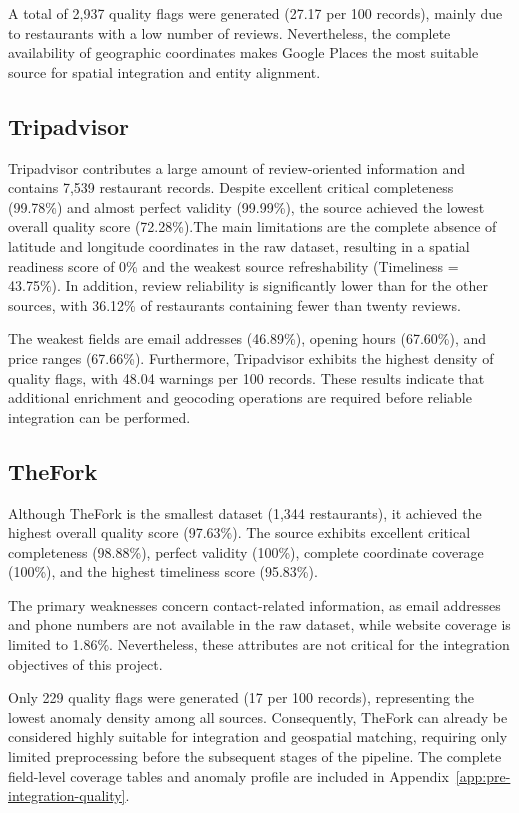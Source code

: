A total of 2,937 quality flags were generated (27.17 per 100 records), mainly due to restaurants with a low number of reviews. Nevertheless, the complete availability of geographic coordinates makes Google Places the most suitable source for spatial integration and entity alignment.

\subsection{Tripadvisor}

Tripadvisor contributes a large amount of review-oriented information and contains 7,539 restaurant records. Despite excellent critical completeness (99.78\%) and almost perfect validity (99.99\%), the source achieved the lowest overall quality score (72.28\%).The main limitations are the complete absence of latitude and longitude coordinates in the raw dataset, resulting in a spatial readiness score of 0\% and the weakest source refreshability (Timeliness = 43.75\%). In addition, review reliability is significantly lower than for the other sources, with 36.12\% of restaurants containing fewer than twenty reviews.

The weakest fields are email addresses (46.89\%), opening hours (67.60\%), and price ranges (67.66\%). Furthermore, Tripadvisor exhibits the highest density of quality flags, with 48.04 warnings per 100 records. These results indicate that additional enrichment and geocoding operations are required before reliable integration can be performed.

\subsection{TheFork}

Although TheFork is the smallest dataset (1,344 restaurants), it achieved the highest overall quality score (97.63\%). The source exhibits excellent critical completeness (98.88\%), perfect validity (100\%), complete coordinate coverage (100\%), and the highest timeliness score (95.83\%).

The primary weaknesses concern contact-related information, as email addresses and phone numbers are not available in the raw dataset, while website coverage is limited to 1.86\%. Nevertheless, these attributes are not critical for the integration objectives of this project.

Only 229 quality flags were generated (17 per 100 records), representing the lowest anomaly density among all sources. Consequently, TheFork can already be considered highly suitable for integration and geospatial matching, requiring only limited preprocessing before the subsequent stages of the pipeline. The complete field-level coverage tables and anomaly profile are included in Appendix~\ref{app:pre-integration-quality}.

